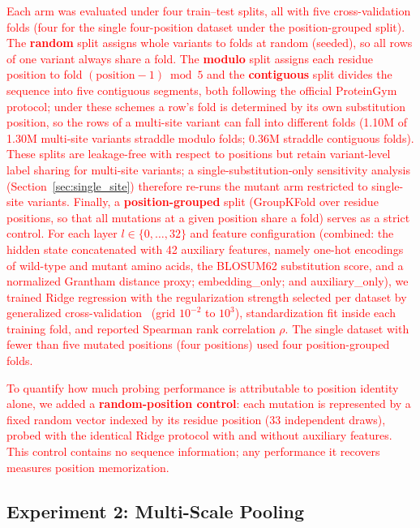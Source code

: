 \documentclass[numbered,webpdf,modern,large]{oup-authoring-template}
\newcommand{\rev}[1]{\textcolor{red}{#1}}
\begin{document}
\rev{Each arm was evaluated under four train--test splits, all with five
cross-validation folds (four for the single four-position dataset under the
position-grouped split). The \textbf{random} split assigns whole variants to
folds at random (seeded), so all rows of one variant always share a fold. The
\textbf{modulo} split assigns each residue position to fold
$(\text{position} - 1) \bmod 5$ and the \textbf{contiguous} split divides the
sequence into five contiguous segments, both following the official ProteinGym
protocol; under these schemes a row's fold is determined by its own
substitution position, so the rows of a multi-site variant can fall into
different folds (1.10M of 1.30M multi-site variants straddle modulo folds;
0.36M straddle contiguous folds). These splits are leakage-free with respect to
positions but retain variant-level label sharing for multi-site variants; a
single-substitution-only sensitivity analysis
(Section~\ref{sec:single_site}) therefore re-runs the mutant arm restricted to
single-site variants. Finally, a \textbf{position-grouped} split (GroupKFold
over residue positions, so that all mutations at a given position share a fold)
serves as a strict control. For each layer $l \in \{0,\dots,32\}$ and
feature configuration (combined: the hidden state concatenated with 42 auxiliary
features, namely one-hot encodings of wild-type and mutant amino acids, the BLOSUM62
substitution score, and a normalized Grantham distance proxy; embedding\_only; and
auxiliary\_only), we trained Ridge regression with the regularization strength
selected per dataset by generalized cross-validation~\cite{golub1979generalized}
(grid $10^{-2}$ to $10^{3}$), standardization fit inside each training fold, and
reported Spearman rank correlation $\rho$. The single
dataset with fewer than five mutated positions (four positions) used four
position-grouped folds.}

\rev{To quantify how much probing performance is attributable to position identity
alone, we added a \textbf{random-position control}: each mutation is represented by a
fixed random vector indexed by its residue position (33 independent draws), probed with
the identical Ridge protocol with and without auxiliary features. This control contains
no sequence information; any performance it recovers measures position memorization.}

\subsection{Experiment 2: Multi-Scale Pooling}
\end{document}
